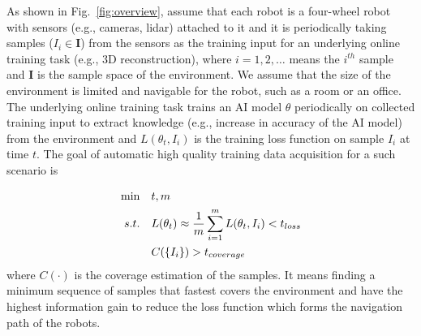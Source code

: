 As shown in Fig.~\ref{fig:overview}, assume that each robot is a four-wheel robot with sensors (e.g., cameras, lidar) attached to it and it is periodically taking samples ($I_i \in \bm{I}$) from the sensors as the training input for an underlying online training task (e.g., 3D reconstruction), where $i=1,2,\dots$ means the $i^{th}$ sample and $\bm{I}$ is the sample space of the environment.
We assume that the size of the environment is limited and navigable for the robot, such as a room or an office.
The underlying online training task trains an AI model $\theta$ periodically on collected training input to extract knowledge (e.g., increase in accuracy of the AI model) from the environment and $L(\theta_t, I_i)$ is the training loss function on sample $I_i$ at time $t$.
The goal of automatic high quality training data acquisition for a such scenario is 

\begin{equation}
  \begin{aligned}
    \vspace{-0.5cm}
    \mathop{\min} & \quad t, m \\
    \mathop{s.t.} & \quad L(\theta_t)\approx \frac{1}{m} \sum_{i=1}^{m} L(\theta_t, I_i) < t_{loss} \\
      & \quad C(\{I_i\}) > t_{coverage}
  \end{aligned}
  \label{mini1}
\end{equation}
where $C(\cdot)$ is the coverage estimation of the samples.
It means finding a minimum sequence of samples that fastest covers the environment and have the highest information gain to reduce the loss function which forms the navigation path of the robots.

    
